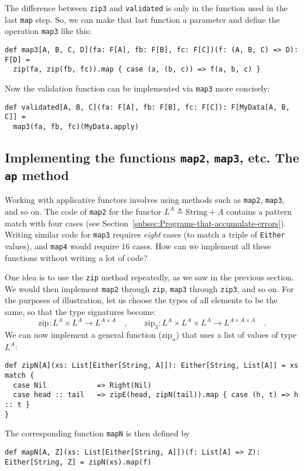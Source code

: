 The difference between \lstinline!zip3! and \lstinline!validated!
is only in the function used in the last \lstinline!map! step. So,
we can make that last function a parameter and define the operation
\lstinline!map3! like this:
\begin{lstlisting}
def map3[A, B, C, D](fa: F[A], fb: F[B], fc: F[C])(f: (A, B, C) => D): F[D] =
  zip(fa, zip(fb, fc)).map { case (a, (b, c)) => f(a, b, c) }
\end{lstlisting}
Now the validation function can be implemented via \lstinline!map3!
more concisely:
\begin{lstlisting}
def validated[A, B, C](fa: F[A], fb: F[B], fc: F[C]): F[MyData[A, B, C]] =
  map3(fa, fb, fc)(MyData.apply)
\end{lstlisting}


\subsection{Implementing the functions \texttt{map2}, \texttt{map3}, etc. The
\texttt{ap} method}

Working with applicative functors involves using methods such as \lstinline!map2!,
\lstinline!map3!, and so on. The code of \lstinline!map2! for the
functor $L^{A}\triangleq\text{String}+A$ contains a pattern match
with four cases (see Section~\ref{subsec:Programs-that-accumulate-errors}).
Writing similar code for \lstinline!map3! requires \emph{eight} cases
(to match a triple of \lstinline!Either! values), and \lstinline!map4!
would require $16$ cases. How can we implement all these functions
without writing a lot of code?

One idea is to use the \lstinline!zip! method repeatedly, as we saw
in the previous section. We would then implement \lstinline!map2!
through \lstinline!zip!, \lstinline!map3! through \lstinline!zip3!,
and so on. For the purposes of illustration, let us choose the types
of all elements to be the same, so that the type signatures become:
\[
\text{zip}:L^{A}\times L^{A}\rightarrow L^{A\times A}\quad,\quad\quad\text{zip}_{3}:L^{A}\times L^{A}\times L^{A}\rightarrow L^{A\times A\times A}\quad.
\]
We can now implement a general function ($\text{zip}_{n}$) that uses
a list of values of type $L^{A}$:
\begin{lstlisting}
def zipN[A](xs: List[Either[String, A]]): Either[String, List[A]] = xs match {
  case Nil            => Right(Nil)
  case head :: tail   => zipE(head, zipN(tail)).map { case (h, t) => h :: t }
}
\end{lstlisting}
The corresponding function \lstinline!mapN! is then defined by
\begin{lstlisting}
def mapN[A, Z](xs: List[Either[String, A]])(f: List[A] => Z): Either[String, Z] = zipN(xs).map(f)
\end{lstlisting}


